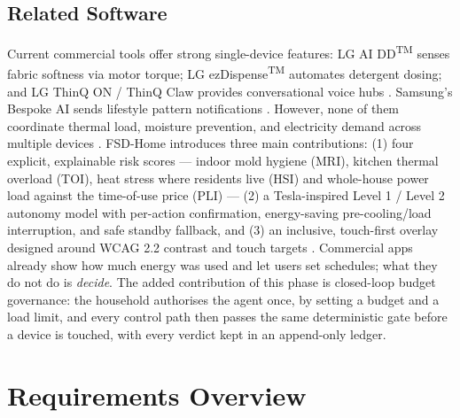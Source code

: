 \documentclass[conference]{IEEEtran}
\begin{document}
\subsection{Related Software}
Current commercial tools offer strong single-device features: LG AI DD\textsuperscript{TM} senses fabric softness via motor torque; LG ezDispense\textsuperscript{TM} automates detergent dosing; and LG ThinQ ON / ThinQ Claw provides conversational voice hubs \cite{lgwhitepaper2024, lgspec2026}. Samsung's Bespoke AI sends lifestyle pattern notifications \cite{samsung2026a, samsung2026b}. However, none of them coordinate thermal load, moisture prevention, and electricity demand across multiple devices \cite{yuan2024}. FSD-Home introduces three main contributions: (1) four explicit, explainable risk scores --- indoor mold hygiene (MRI), kitchen thermal overload (TOI), heat stress where residents live (HSI) and whole-house power load against the time-of-use price (PLI) --- (2) a Tesla-inspired Level 1 / Level 2 autonomy model with per-action confirmation, energy-saving pre-cooling/load interruption, and safe standby fallback, and (3) an inclusive, touch-first overlay designed around WCAG 2.2 contrast and touch targets \cite{wcag2023}. Commercial apps already show how much energy was used and let users set schedules; what they do not do is \emph{decide}. The added contribution of this phase is closed-loop budget governance: the household authorises the agent once, by setting a budget and a load limit, and every control path then passes the same deterministic gate before a device is touched, with every verdict kept in an append-only ledger.

\section{Requirements Overview}
\end{document}

